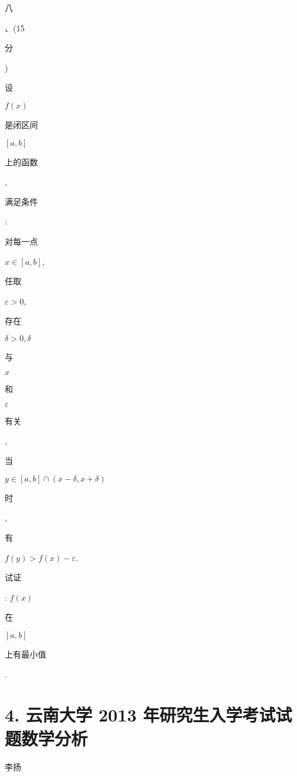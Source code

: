 \documentclass[10pt]{article}
\begin{document}
\begin{CJK}{UTF8}{mj}八\end{CJK}、(15 \begin{CJK}{UTF8}{mj}分\end{CJK}) \begin{CJK}{UTF8}{mj}设\end{CJK} $f(x)$ \begin{CJK}{UTF8}{mj}是闭区间\end{CJK} $[a, b]$ \begin{CJK}{UTF8}{mj}上的函数\end{CJK}, \begin{CJK}{UTF8}{mj}满足条件\end{CJK}: \begin{CJK}{UTF8}{mj}对每一点\end{CJK} $x \in[a, b]$, \begin{CJK}{UTF8}{mj}任取\end{CJK} $\varepsilon>0$, \begin{CJK}{UTF8}{mj}存在\end{CJK} $\delta>0, \delta$ \begin{CJK}{UTF8}{mj}与\end{CJK} $x$ \begin{CJK}{UTF8}{mj}和\end{CJK} $\varepsilon$ \begin{CJK}{UTF8}{mj}有关\end{CJK}, \begin{CJK}{UTF8}{mj}当\end{CJK} $y \in[a, b] \cap(x-\delta, x+\delta)$ \begin{CJK}{UTF8}{mj}时\end{CJK}, \begin{CJK}{UTF8}{mj}有\end{CJK} $f(y)>f(x)-\varepsilon$. \begin{CJK}{UTF8}{mj}试证\end{CJK}: $f(x)$ \begin{CJK}{UTF8}{mj}在\end{CJK} $[a, b]$ \begin{CJK}{UTF8}{mj}上有最小值\end{CJK}.

\section{4. 云南大学 2013 年研究生入学考试试题数学分析}
\begin{CJK}{UTF8}{mj}李扬\end{CJK}
\end{document}
